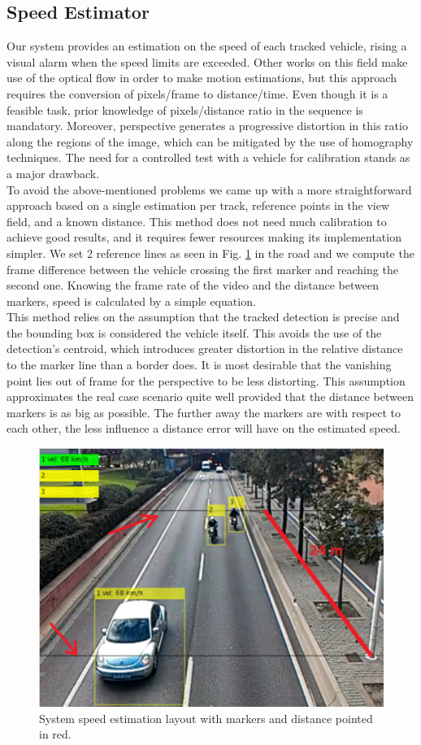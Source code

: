 \subsection{Speed Estimator}
\label{sec:speed}
Our system provides an estimation on the speed of each tracked vehicle, rising a visual alarm when the speed limits are exceeded. Other works on this field make use of the optical flow in order to make motion estimations, but this approach requires the conversion of pixels/frame to distance/time. Even though it is a feasible task, prior knowledge of pixels/distance ratio in the sequence is mandatory. Moreover, perspective generates a progressive distortion in this ratio along the regions of the image, which can be mitigated by the use of homography techniques. The need for a controlled test with a vehicle for calibration stands as a major drawback.\\ 

\noindent To avoid the above-mentioned problems we came up with a more straightforward approach based on a single estimation per track, reference points in the view field, and a known distance. This method does not need much calibration to achieve good results, and it requires fewer resources making its implementation simpler. We set 2 reference lines as seen in Fig. \ref{fig:layout} in the road and we compute the frame difference between the vehicle crossing the first marker and reaching the second one. Knowing the frame rate of the video and the distance between markers, speed is calculated by a simple equation. \\

\noindent This method relies on the assumption that the tracked detection is precise and the bounding box is considered the vehicle itself. This avoids the use of the detection's centroid, which introduces greater distortion in the relative distance to the marker line than a border does. It is most desirable that the vanishing point lies out of frame for the perspective to be less distorting. This assumption approximates the real case scenario quite well provided that the distance between markers is as big as possible. The further away the markers are with respect to each other, the less influence a distance error will have on the estimated speed.

\begin{figure}[t]
\centering
\includegraphics[width=0.9\linewidth]{figures/system}
\caption{System speed estimation layout with markers and distance pointed in red.}
\label{fig:layout}
\end{figure}

  
